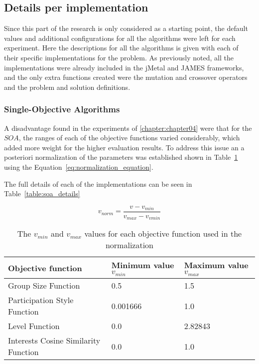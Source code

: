 \subsection{Details per implementation}

Since this part of the research is only considered as a starting point, the default values and additional configurations for all the algorithms were left for each experiment. Here the descriptions for all the algorithms is given with each of their specific implementations for the problem. As previously noted, all the implementations were already included in the jMetal and JAMES frameworks, and the only extra functions created were the mutation and crossover operators and the problem and solution definitions.

\subsubsection{Single-Objective Algorithms}

A disadvantage found in the experiments of \ref{chapter:chapter04} were that for the $SOA$, the ranges of each of the objective functions varied considerably, which added more weight for the higher evaluation results. To address this issue an a posteriori normalization of the parameters was established shown in Table~\ref{table:normalization_parameters} using the Equation~\ref{eq:normalization_equation}.

The full details of each of the implementations can be seen in Table~\ref{table:soa_details}

\begin{equation}
    v_{norm} = \frac{v- v_{min}}{v_{max} - v_{vmin}} 
    \label{eq:normalization_equation}
\end{equation}

\begin{table}[]
    \begin{tabular}{lll}
    \hline
    Objective function & Minimum value $v_{min}$ & Maximum value $v_{max}$ \\
    \hline
    Group Size Function                  & 0.5                     & 1.5                     \\
    Participation Style Function         & 0.001666                & 1.0                     \\
    Level Function                       & 0.0                     & 2.82843                 \\
    Interests Cosine Similarity Function & 0.0                     & 1.0                     \\
    \hline
    \end{tabular}
    \caption{The $v_{min}$ and $v_{max}$ values for each objective function used in the normalization}
    \label{table:normalization_parameters}
\end{table}

